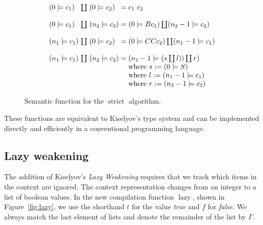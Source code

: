 \documentclass[conference]{IEEEtran}
\DeclareMathOperator{\strict}{strict}
\DeclareMathOperator{\lazy}{lazy}
\begin{document}
\begin{figure}
    \begin{equation*}
        \arraycolsep=1.4pt
        \begin{array}{l l l l l}
            (0 \models c_1)   & \coprod & (0 \models c_2)   & = & c_1 \ c_2                                         \\
            \\
            (0 \models c_1)   & \coprod & (n_2 \models c_2) & = & (0 \models B c_1) \coprod (n_2 - 1 \models c_2)   \\
            \\
            (n_1 \models c_1) & \coprod & (0 \models c_2)   & = & (0 \models C C c_2) \coprod (n_1 - 1 \models c_1) \\
            \\
            (n_1 \models c_1) & \coprod & (n_2 \models c_2) & = & (n_1 - 1 \models (s \coprod l)) \coprod r)        \\
                              &         &                   &   & \text{where } s := (0 \models S )                 \\
                              &         &                   &   & \text{where } l := (n_1-1 \models c_1 )           \\
                              &         &                   &   & \text{where } r := (n_2-1 \models c_2 )           \\
        \end{array}
    \end{equation*}
    \centering
    \caption{Semantic function for the $\strict$ algorithm.}
    \label{fig:strict-sem}
\end{figure}

These functions are equivalent to Kiselyov's type system and can be implemented directly and efficiently in a conventional programming language.

\subsection{Lazy weakening}
The addition of Kiselyov's \textit{Lazy Weakening} requires that we track which items in the context are ignored.
The context representation changes from an integer to a list of boolean values.
In the new compilation function $\lazy$, shown in Figure~\ref{fig:lazy}, we use the shorthand $t$ for the value \textit{true} and $f$ for \textit{false}.
We always match the last element of lists and denote the remainder of the list by $\Gamma$.
\end{document}
